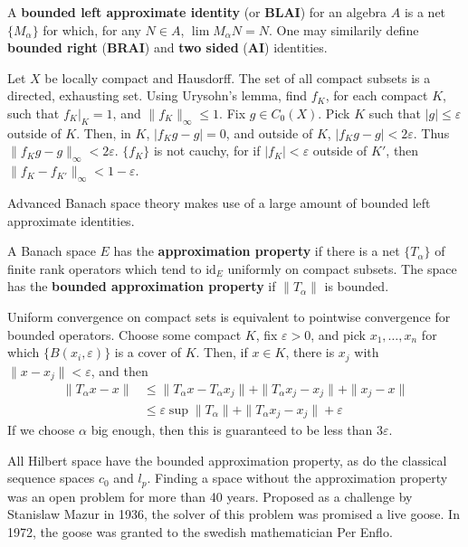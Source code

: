 \begin{definition}
    A {\bf bounded left approximate identity} (or {\bf BLAI}) for an algebra $A$ is a net $\{ M_\alpha \}$ for which, for any $N \in A$, $\lim M_\alpha N = N$. One may similarily define {\bf bounded right} ({\bf BRAI}) and {\bf two sided} ({\bf AI}) identities.
\end{definition}

\begin{example}
    Let $X$ be locally compact and Hausdorff. The set of all compact subsets is a directed, exhausting set. Using Urysohn's lemma, find $f_K$, for each compact $K$, such that $f_K |_K = 1$, and $\| f_K \|_\infty \leq 1$. Fix $g \in C_0(X)$. Pick $K$ such that $|g| \leq \varepsilon$ outside of $K$. Then, in $K$, $|f_K g - g| = 0$, and outside of $K$, $|f_K g - g| < 2 \varepsilon$. Thus $\| f_K g - g \|_\infty < 2 \varepsilon$. $\{ f_K \}$ is not cauchy, for if $|f_K| < \varepsilon$ outside of $K'$, then $\| f_K - f_{K'} \|_\infty < 1 - \varepsilon$.
\end{example}

Advanced Banach space theory makes use of a large amount of bounded left approximate identities.

\begin{definition}
    A Banach space $E$ has the {\bf approximation property} if there is a net $\{ T_\alpha \}$ of finite rank operators which tend to $\text{id}_E$ uniformly on compact subsets. The space has the {\bf bounded approximation property} if $\| T_\alpha \|$ is bounded.
\end{definition}

Uniform convergence on compact sets is equivalent to pointwise convergence for bounded operators. Choose some compact $K$, fix $\varepsilon > 0$, and pick $x_1, \dots, x_n$ for which $\{ B(x_i, \varepsilon) \}$ is a cover of $K$. Then, if $x \in K$, there is $x_j$ with $\| x - x_j \| < \varepsilon$, and then
%
\begin{align*}
    \| T_\alpha x - x \| &\leq \| T_\alpha x - T_\alpha x_j \| + \| T_\alpha x_j - x_j \| + \| x_j - x \|\\
    &\leq \varepsilon \sup \|T_\alpha\| + \| T_\alpha x_j - x_j \| + \varepsilon
\end{align*}
%
If we choose $\alpha$ big enough, then this is guaranteed to be less than $3 \varepsilon$.

\begin{example}
    All Hilbert space have the bounded approximation property, as do the classical sequence spaces $c_0$ and $l_p$. Finding a space without the approximation property was an open problem for more than 40 years. Proposed as a challenge by Stanislaw Mazur in 1936, the solver of this problem was promised a live goose. In 1972, the goose was granted to the swedish mathematician Per Enflo.
\end{example}

